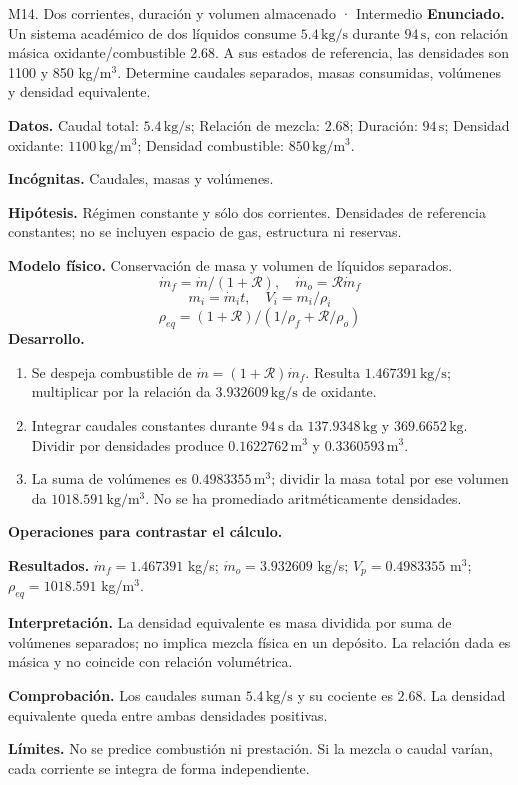 \begin{studiumworked}{M14. Dos corrientes, duración y volumen almacenado · Intermedio}
\textbf{Enunciado.} Un sistema académico de dos líquidos consume $5.4\,\mathrm{kg/s}$ durante $94\,\mathrm{s}$, con relación másica oxidante/combustible $2.68$. A sus estados de referencia, las densidades son 1100 y 850 kg/m$^3$. Determine caudales separados, masas consumidas, volúmenes y densidad equivalente.

\textbf{Datos.} Caudal total: $5.4\,\mathrm{kg/s}$; Relación de mezcla: $2.68$; Duración: $94\,\mathrm{s}$; Densidad oxidante: $1100\,\mathrm{kg/m^3}$; Densidad combustible: $850\,\mathrm{kg/m^3}$.

\textbf{Incógnitas.} Caudales, masas y volúmenes.

\textbf{Hipótesis.} Régimen constante y sólo dos corrientes. Densidades de referencia constantes; no se incluyen espacio de gas, estructura ni reservas.

\textbf{Modelo físico.} Conservación de masa y volumen de líquidos separados.
\[\dot m_f=\dot m/(1+\mathcal R),\quad \dot m_o=\mathcal R\dot m_f\]
\[m_i=\dot m_it,\quad V_i=m_i/\rho_i\]
\[\rho_{eq}=(1+\mathcal R)/(1/\rho_f+\mathcal R/\rho_o)\]
\textbf{Desarrollo.}
\begin{enumerate}
\item Se despeja combustible de $\dot m=(1+\mathcal R)\dot m_f$. Resulta $1.467391\,\mathrm{kg/s}$; multiplicar por la relación da $3.932609\,\mathrm{kg/s}$ de oxidante.
\item Integrar caudales constantes durante $94\,\mathrm{s}$ da $137.9348\,\mathrm{kg}$ y $369.6652\,\mathrm{kg}$. Dividir por densidades produce $0.1622762\,\mathrm{m^3}$ y $0.3360593\,\mathrm{m^3}$.
\item La suma de volúmenes es $0.4983355\,\mathrm{m^3}$; dividir la masa total por ese volumen da $1018.591\,\mathrm{kg/m^3}$. No se ha promediado aritméticamente densidades.
\end{enumerate}
\textbf{Operaciones para contrastar el cálculo.}

\textbf{Resultados.} $\dot m_f=1.467391$ kg/s; $\dot m_o=3.932609$ kg/s; $V_p=0.4983355$ m$^3$; $\rho_{eq}=1018.591$ kg/m$^3$.

\textbf{Interpretación.} La densidad equivalente es masa dividida por suma de volúmenes separados; no implica mezcla física en un depósito. La relación dada es másica y no coincide con relación volumétrica.

\textbf{Comprobación.} Los caudales suman $5.4\,\mathrm{kg/s}$ y su cociente es $2.68$. La densidad equivalente queda entre ambas densidades positivas.

\textbf{Límites.} No se predice combustión ni prestación. Si la mezcla o caudal varían, cada corriente se integra de forma independiente.
\end{studiumworked}
